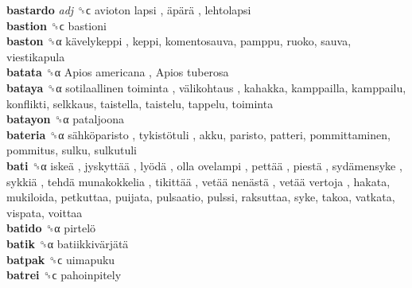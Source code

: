 \textbf{bastardo} \emph{adj}  ␝ϲ   avioton lapsi ,  äpärä , lehtolapsi  \\
\textbf{bastion} ␝ϲ  bastioni  \\
\textbf{baston} ␝α   kävelykeppi , keppi, komentosauva, pamppu, ruoko, sauva, viestikapula  \\
\textbf{batata} ␝α   Apios americana ,  Apios tuberosa   \\
\textbf{bataya} ␝α   sotilaallinen toiminta ,  välikohtaus , kahakka, kamppailla, kamppailu, konflikti, selkkaus, taistella, taistelu, tappelu, toiminta  \\
\textbf{batayon} ␝α  pataljoona  \\
\textbf{bateria} ␝α   sähköparisto ,  tykistötuli , akku, paristo, patteri, pommittaminen, pommitus, sulku, sulkutuli  \\
\textbf{bati} ␝α   iskeä ,  jyskyttää ,  lyödä ,  olla ovelampi ,  pettää ,  piestä ,  sydämensyke ,  sykkiä ,  tehdä munakokkelia ,  tikittää ,  vetää nenästä ,  vetää vertoja , hakata, mukiloida, petkuttaa, puijata, pulsaatio, pulssi, raksuttaa, syke, takoa, vatkata, vispata, voittaa  \\
\textbf{batido} ␝α   pirtelö   \\
\textbf{batik} ␝α   batiikkivärjätä   \\
\textbf{batpak} ␝ϲ  uimapuku  \\
\textbf{batrei} ␝ϲ  pahoinpitely  \\
